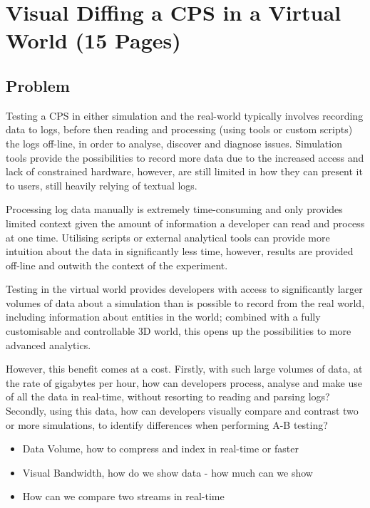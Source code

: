 \chapter{Visual Diffing a CPS in a Virtual World (15 Pages)}

\section{Problem}
\label{sec:Problem}
Testing a CPS in either simulation and the real-world typically involves recording data to logs, before then reading and processing (using tools or custom scripts) the logs off-line, in order to analyse, discover and diagnose issues. Simulation tools provide the possibilities to record more data due to the increased access and lack of constrained hardware, however, are still limited in how they can present it to users, still heavily relying of textual logs.

Processing log data manually is extremely time-consuming and only provides limited context given the amount of information a developer can read and process at one time. Utilising scripts or external analytical tools can provide more intuition about the data in significantly less time, however, results are provided off-line and outwith the context of the experiment.

Testing in the virtual world provides developers with access to significantly larger volumes of data about a simulation than is possible to record from the real world, including information about entities in the world; combined with a fully customisable and controllable 3D world, this opens up the possibilities to more advanced analytics. 

However, this benefit comes at a cost. Firstly, with such large volumes of data, at the rate of gigabytes per hour, how can developers process, analyse and make use of all the data in real-time, without resorting to reading and parsing logs? Secondly, using this data, how can developers visually compare and contrast two or more simulations, to identify differences when performing A-B testing?

\begin{itemize}
  \item Data Volume, how to compress and index in real-time or faster
  \item Visual Bandwidth, how do we show data - how much can we show
  \item How can we compare two streams in real-time
\end{itemize}

